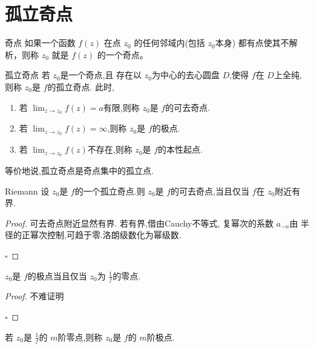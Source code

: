 \documentclass[../../复变函数.tex]{subfiles}
\begin{document}
\section{孤立奇点}

\begin{definition}{奇点}
     如果一个函数 $f(z)$ 在点 $z_0$ 的任何邻域内(包括 \(  z_0  \)本身) 都有点使其不解析，则称 $z_0$ 就是 $f(z)$ 的一个奇点。
\end{definition}

\begin{definition}{孤立奇点}
    若 \(  z_0  \)是一个奇点,且  存在以 \(  z_0  \)为中心的去心圆盘 \(  D  \),使得 \(  f  \)在 \(  D  \)上全纯,则称 \(  z_0  \)是 \(  f  \)的孤立奇点.      此时,
    \begin{enumerate}
        \item 若 \(  \lim_{z\to z_0}f\left( z \right)= a   \)有限,则称 \(  z_0  \)是 \(  f  \)的可去奇点.
        \item 若 \(  \lim_{z\to z_0}f\left( z \right)= \infty   \),则称 \(  z_0  \)是 \(  f  \)的极点.
        \item 若 \(  \lim_{z\to z_0}f\left( z \right)   \)不存在,则称 \(  z_0  \)是 \(  f  \)的本性起点.         
    \end{enumerate}
    
\end{definition}
\begin{remark}
    等价地说,孤立奇点是奇点集中的孤立点.
\end{remark}
\begin{theorem}{Riemann}
    设 \(  z_0  \)是 \(  f  \)的一个孤立奇点.则  \(  z_0  \)是 \(  f  \)的可去奇点,当且仅当 \(  f  \)在 \(  z_0  \)附近有界.    
\end{theorem}
\begin{proof}
    可去奇点附近显然有界. 若有界,借由Cauchy不等式, 复幂次的系数 \(  a_{-n}  \)由 半径的正幂次控制,可趋于零.洛朗级数化为幂级数. 

    \hfill $\square$
\end{proof}

\begin{proposition}
    \(  z_0  \)是 \(  f  \)的极点当且仅当 \(  z_0  \)为 \(  \frac{1 }{f }   \)的零点.    
\end{proposition}
\begin{proof}
    不难证明

    \hfill $\square$
\end{proof}

\begin{definition}  
    若 \(  z_0  \)是 \(  \frac{1 }{f }   \)的 \(  m  \)阶零点,则称 \(  z_0  \)是 \(  f  \)的 \(  m  \)阶极点.      
\end{definition}
\end{document}
